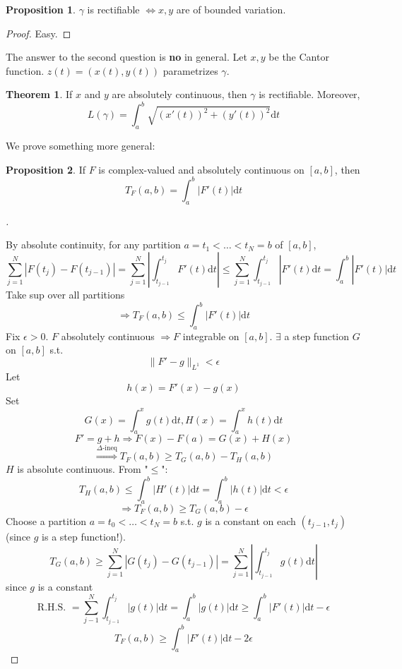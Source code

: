 \documentclass{article}
\theoremstyle{definition}
\newtheorem{thm}{Theorem}
\newtheorem{prop}{Proposition}
\newenvironment{proofs}[1][\proofname]{%
  \begin{proof}[#1]$ $\par\nobreak\ignorespaces
}{%
  \end{proof}
}
\begin{document}
\begin{prop}
  $\gamma$ is rectifiable $\iff x, y$ are of bounded variation. 
\end{prop}

\begin{proof}
  Easy.
\end{proof}

The answer to the second question is \textbf{no} in general. Let $x, y$ be the Cantor function. $z(t) = (x(t), y(t))$ parametrizes $\gamma$. 

\begin{thm}
  If $x$ and $y$ are absolutely continuous, then $\gamma$ is rectifiable. Moreover, 
  \[
    L(\gamma) = \int_a^b \sqrt{(x'(t))^2 + (y'(t))^2} \mathrm{d} t
  \]
\end{thm}

We prove something more general:

\begin{prop}
  If $F$ is complex-valued and absolutely continuous on $[a, b]$, then 
  \[
    T_F(a, b) = \int_a^b |F'(t)| \mathrm{d} t
  \]
\end{prop}

\begin{proofs}
  By absolute continuity, for any partition $a = t_1 < \hdots < t_N = b$ of $[a, b]$, 
  \[
    \sum_{j = 1}^N |F(t_j) - F(t_{j - 1})| = \sum_{j = 1}^N |\int_{t_{j - 1}}^{t_j} F'(t) \mathrm{d} t| \leq \sum_{j = 1}^N \int_{t_{j - 1}}^{t_j} |F'(t) \mathrm{d} t = \int_a^b |F'(t)| \mathrm{d} t
  \]
  Take sup over all partitions
  \[
    \Rightarrow T_F(a, b) \leq \int_a^b |F'(t)| \mathrm{d} t
  \]
  Fix $\epsilon > 0$. $F$ absolutely continuous $\Rightarrow F$ integrable on $[a, b]$. $\exists $ a step function $G$ on $[a, b]$ s.t.
  \[
    \|F' - g\|_{L^1} < \epsilon
  \]
  Let 
  \[
	h(x) = F'(x) - g(x)
  \]
  Set 
  \[
    G(x) = \int_a^x g(t) \mathrm{d} t, H(x) = \int_a^x h(t) \mathrm{d} t
  \]
  \[
    F' = g + h \Rightarrow F(x) - F(a) = G(x) + H(x)
  \]
  \[
    \stackrel{\Delta \text{-ineq}}{\Rightarrow } T_F(a, b) \geq T_G(a, b) - T_H(a, b)
  \]
  $H$ is absolute continuous. From "$\leq$": 
  \[
    T_H(a, b) \leq \int_a^b |H'(t)| \mathrm{d} t = \int_a^b |h(t)| \mathrm{d} t < \epsilon
  \]
  \[
    \Rightarrow T_F(a, b) \geq T_G(a, b) - \epsilon
  \]
  Choose a partition $a = t_0 < \hdots < t_N = b$ s.t. $g$ is a constant on each $(t_{j - 1}, t_j)$ (since $g$ is a step function!). 
  \[
    T_G(a, b) \geq \sum_{j = 1}^N |G(t_j) - G(t_{j - 1})| = \sum_{j = 1}^N \left|\int_{t_{j - 1}}^{t_j} g(t) \mathrm{d} t \right|
  \]
  since $g$ is a constant
  \[
    \text{R.H.S. }= \sum_{j - 1}^N \int_{t_{j - 1}}^{t_j} |g(t)| \mathrm{d} t = \int_a^b |g(t)| \mathrm{d} t \geq \int_a^b |F'(t)| \mathrm{d} t - \epsilon
  \]
  \[
    T_F(a, b) \geq \int_a^b |F'(t)| \mathrm{d} t - 2 \epsilon
  \]
\end{proofs}
\end{document}
